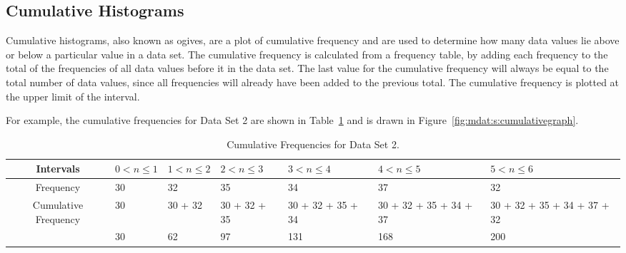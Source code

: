 \subsection{Cumulative Histograms}
Cumulative histograms, also known as ogives, are a plot of cumulative frequency and are used to determine how many data values lie above or below a particular value in a data set. The cumulative frequency is calculated from a frequency table, by adding each frequency to the total of the frequencies of all data values before it in the data set. The last value for the cumulative frequency will always be equal to the total number of data values, since all frequencies will already have been added to the previous total. The cumulative frequency is plotted at the upper limit of the interval.

For example, the cumulative frequencies for Data Set 2 are shown in Table~\ref{tab:mdat:s:cumulativeds2} and is drawn in Figure~\ref{fig:mdat:s:cumulativegraph}.

\begin{table}[htb]
\begin{center}
\begin{tabular}{|c||p{1cm}|p{1cm}|p{1cm}|p{1cm}|p{1cm}|p{1cm}|}\hline
Intervals & $0<n\leq 1 $ & $1<n\leq 2 $ & $2<n\leq 3 $ & $3<n\leq 4 $ & $4<n\leq 5$ & $5<n\leq 6 $ \\ 
\hline
Frequency & 30 &32 &35 &34 &37 &32\\
\hline
Cumulative Frequency & 30 &30 + 32 &30 + 32 + 35 &30 + 32 + 35 + 34 &30 + 32 + 35 + 34 + 37 &30 + 32 + 35 + 34 + 37 + 32\\
\hline
& 30 & 62 & 97 & 131 & 168 & 200\\
\hline
\end{tabular}
\caption{Cumulative Frequencies for Data Set 2. \label{tab:mdat:s:cumulativeds2}}
\end{center}
\end{table}

